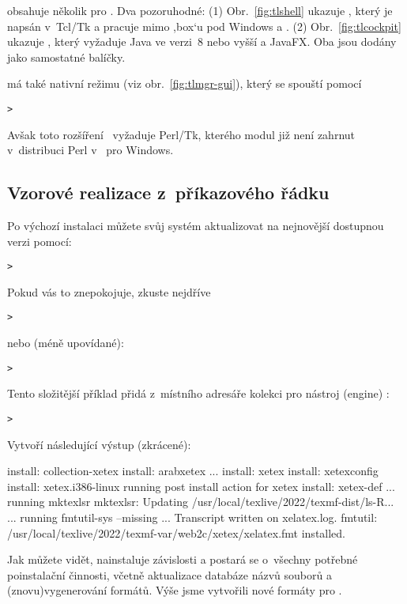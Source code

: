 \documentclass[\classoptions,slovak,english,czech]{\classname}
\newcommand{\singleuv}[1]{,#1`}
\begin{document}
\TL{} obsahuje několik \GUI{} pro . 
Dva pozoruhodné: (1) Obr.~\ref{fig:tlshell} ukazuje ,
který je napsán v~Tcl/Tk a pracuje mimo \singleuv{box}u pod Windows
a \MacOSX. (2) Obr.~\ref{fig:tlcockpit} ukazuje ,
který vyžaduje Java ve verzi~8 nebo vyšší a JavaFX. 
Oba jsou dodány jako samostatné balíčky.

 má také nativní režimu \GUI{} 
(viz obr.~\ref{fig:tlmgr-gui}), který se spouští pomocí
\begin{alltt}
> 
\end{alltt}
Avšak toto rozšíření \GUI\ vyžaduje Perl/Tk, kterého modul již není
zahrnut v~distribuci Perl v~\TL{} pro Windows.



\subsection{Vzorové realizace  z~příkazového řádku}

Po výchozí instalaci můžete svůj systém aktualizovat
na nejnovější dostupnou verzi pomocí:
\begin{alltt}
> 
\end{alltt}
Pokud vás to znepokojuje, zkuste nejdříve
\begin{alltt}
> 
\end{alltt}
nebo (méně upovídané):
\begin{alltt}
> 
\end{alltt}

Tento složitější příklad přidá z~místního adresáře kolekci
pro nástroj (engine) \XeTeX:

\begin{alltt}
> 
\end{alltt}
Vytvoří následující výstup (zkrácené):
\begin{fverbatim}
install: collection-xetex
install: arabxetex
...
install: xetex
install: xetexconfig
install: xetex.i386-linux
running post install action for xetex
install: xetex-def
...
running mktexlsr
mktexlsr: Updating /usr/local/texlive/2022/texmf-dist/ls-R...
...
running fmtutil-sys --missing
...
Transcript written on xelatex.log.
fmtutil: /usr/local/texlive/2022/texmf-var/web2c/xetex/xelatex.fmt installed.
\end{fverbatim}

Jak můžete vidět,  nainstaluje závislosti
a postará se o~všechny potřebné poinstalační činnosti, 
včetně aktualizace databáze názvů souborů 
a (znovu)vygenerování formátů.  Výše jsme vytvořili
nové formáty pro \XeTeX.
\end{document}
